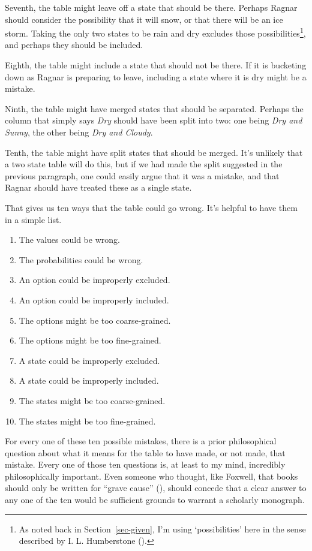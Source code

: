\documentclass[
  10pt,
  letterpaper,
  twoside]{scrbook}
\providecommand{\tightlist}{%
  \setlength{\itemsep}{0pt}\setlength{\parskip}{0pt}}\usepackage{longtable,booktabs,array}
\begin{document}
Seventh, the table might leave off a state that should be there. Perhaps
Ragnar should consider the possibility that it will snow, or that there
will be an ice storm. Taking the only two states to be rain and dry
excludes those possibilities\footnote{As noted back in
  Section~\ref{sec-given}, I'm using `possibilities' here in the sense
  described by I. L. Humberstone ().},
and perhaps they should be included.

Eighth, the table might include a state that should not be there. If it
is bucketing down as Ragnar is preparing to leave, including a state
where it is dry might be a mistake.

Ninth, the table might have merged states that should be separated.
Perhaps the column that simply says \emph{Dry} should have been split
into two: one being \emph{Dry and Sunny}, the other being \emph{Dry and
Cloudy}.

Tenth, the table might have split states that should be merged. It's
unlikely that a two state table will do this, but if we had made the
split suggested in the previous paragraph, one could easily argue that
it was a mistake, and that Ragnar should have treated these as a single
state.

That gives us ten ways that the table could go wrong. It's helpful to
have them in a simple list.

\begin{enumerate}
\def\labelenumi{\arabic{enumi}.}
\tightlist
\item
  The values could be wrong.
\item
  The probabilities could be wrong.
\item
  An option could be improperly excluded.
\item
  An option could be improperly included.
\item
  The options might be too coarse-grained.
\item
  The options might be too fine-grained.
\item
  A state could be improperly excluded.
\item
  A state could be improperly included.
\item
  The states might be too coarse-grained.
\item
  The states might be too fine-grained.
\end{enumerate}

For every one of these ten possible mistakes, there is a prior
philosophical question about what it means for the table to have made,
or not made, that mistake. Every one of those ten questions is, at least
to my mind, incredibly philosophically important. Even someone who
thought, like Foxwell, that books should only be written for ``grave
cause'' (), should
concede that a clear answer to any one of the ten would be sufficient
grounds to warrant a scholarly monograph.
\end{document}
